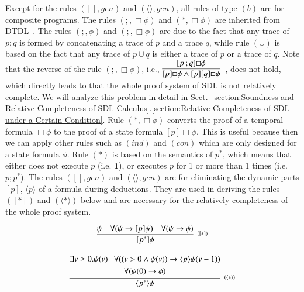 \documentclass{fcs}
\newcommand{\la}[0]{\langle}
\newcommand{\ra}[0]{\rangle}
\newcommand{\noth}[0]{\mathbf{1}}
\DeclareMathOperator{\seq}{;}
\begin{document}
Except for the rules $([],\mathit{gen})$ and $(\la\ra, \mathit{gen})$, all rules of type $(b)$ are for composite programs.
The rules $(\seq, \Box\phi)$ and $(*, \Box\phi)$ are inherited from DTDL~\cite{Harel00}.
The rules $(\seq,\phi)$ and $(\seq,\Box\phi)$ are due to the fact that any trace of $p\seq q$ is formed by concatenating a trace of $p$ and a trace $q$,
while rule $(\cup)$ is based on the fact that any trace of $p\cup q$ is either a trace of $p$ or a trace of $q$.
Note that the reverse of the rule $(\seq, \Box\phi)$, i.e.,
    $\begin{aligned}\infer[]
                 {
                    [p]\Box\phi
                    \wedge
                    [p][q]\Box\phi
                 }
                 {
                    [p\seq q]\Box\phi
                 }
    \end{aligned}$, does not hold, which directly leads to that the whole proof system of SDL is not relatively complete.
We will analyze this problem in detail in Sect.~\ref{section:Soundness and Relative Completeness of SDL Calculus}.\ref{section:Relative Completeness of SDL under a Certain Condition}.
Rule $(*, \Box\phi)$ converts the proof of a temporal formula $\Box\phi$ to the proof of a state formula $[p]\Box\phi$.
This is useful because then we can apply other rules such as $(\mathit{ind})$ and $(\mathit{con})$ which are only designed for a state formula $\phi$.
Rule $(*)$ is based on the semantics of $p^*$, which means that either does not execute $p$ (i.e. $\noth$), or executes $p$ for 1 or more than 1 times (i.e. $p;p^*$).
The rules $([], \mathit{gen})$ and $(\la\ra, \mathit{gen})$ are for eliminating the dynamic parts $[p]$, $\la p\ra$ of a formula during deductions.
They are used in deriving the rules $([*])$ and $(\la *\ra)$ below and are necessary for the relatively completeness of the whole proof system.


\begin{equation}
\infer[^{([*])}]
{
    [p^*]\phi
}
{
    \psi
    &
    \forall(\psi \to [p]\psi)
    &
    \forall(\psi\to \phi)
}
\end{equation}

\begin{equation}
\infer[^{(\la *\ra)}]
{
    \la p^*\ra \phi
}
{
    \begin{gathered}
    \exists v\ge 0. \psi(v)
    \ \ \
    \forall((v>0\wedge \psi(v))\to \la p\ra \psi(v-1))
    \\
    \forall(\psi(0) \to \phi)
    \end{gathered}
}
\end{equation}
\end{document}

